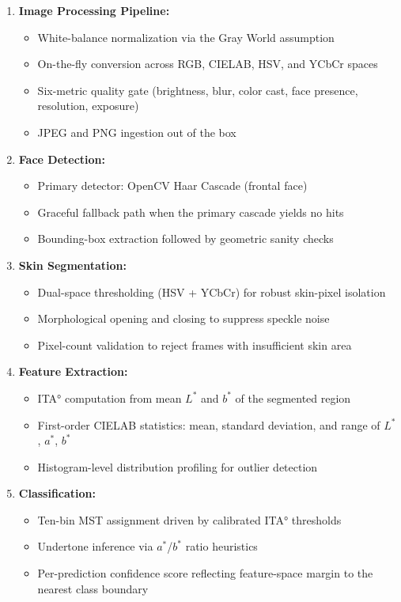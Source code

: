 \begin{enumerate}
    \item \textbf{Image Processing Pipeline:}
    \begin{itemize}
        \item White-balance normalization via the Gray World assumption
        \item On-the-fly conversion across RGB, CIELAB, HSV, and YCbCr spaces
        \item Six-metric quality gate (brightness, blur, color cast, face presence, resolution, exposure)
        \item JPEG and PNG ingestion out of the box
    \end{itemize}
    
    \item \textbf{Face Detection:}
    \begin{itemize}
        \item Primary detector: OpenCV Haar Cascade (frontal face)
        \item Graceful fallback path when the primary cascade yields no hits
        \item Bounding-box extraction followed by geometric sanity checks
    \end{itemize}
    
    \item \textbf{Skin Segmentation:}
    \begin{itemize}
        \item Dual-space thresholding (HSV + YCbCr) for robust skin-pixel isolation
        \item Morphological opening and closing to suppress speckle noise
        \item Pixel-count validation to reject frames with insufficient skin area
    \end{itemize}
    
    \item \textbf{Feature Extraction:}
    \begin{itemize}
        \item ITA° computation from mean $L^*$ and $b^*$ of the segmented region
        \item First-order CIELAB statistics: mean, standard deviation, and range of $L^*$, $a^*$, $b^*$
        \item Histogram-level distribution profiling for outlier detection
    \end{itemize}
    
    \item \textbf{Classification:}
    \begin{itemize}
        \item Ten-bin MST assignment driven by calibrated ITA° thresholds
        \item Undertone inference via $a^*$/$b^*$ ratio heuristics
        \item Per-prediction confidence score reflecting feature-space margin to the nearest class boundary
    \end{itemize}
    

\end{enumerate}
